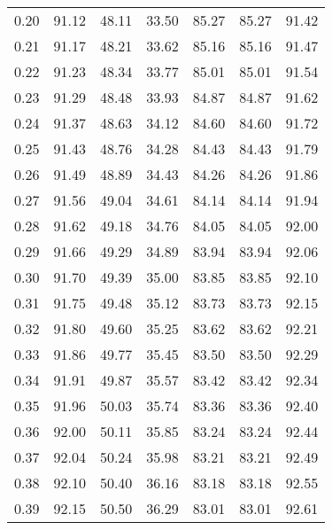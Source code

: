 \begin{tabular}{|c|c|c|c|c|c|c|}
      0.20 &     91.12 &     48.11 &      33.50 &   85.27 &      85.27 &         91.42 \\
      0.21 &     91.17 &     48.21 &      33.62 &   85.16 &      85.16 &         91.47 \\
      0.22 &     91.23 &     48.34 &      33.77 &   85.01 &      85.01 &         91.54 \\
      0.23 &     91.29 &     48.48 &      33.93 &   84.87 &      84.87 &         91.62 \\
      0.24 &     91.37 &     48.63 &      34.12 &   84.60 &      84.60 &         91.72 \\
      0.25 &     91.43 &     48.76 &      34.28 &   84.43 &      84.43 &         91.79 \\
      0.26 &     91.49 &     48.89 &      34.43 &   84.26 &      84.26 &         91.86 \\
      0.27 &     91.56 &     49.04 &      34.61 &   84.14 &      84.14 &         91.94 \\
      0.28 &     91.62 &     49.18 &      34.76 &   84.05 &      84.05 &         92.00 \\
      0.29 &     91.66 &     49.29 &      34.89 &   83.94 &      83.94 &         92.06 \\
      0.30 &     91.70 &     49.39 &      35.00 &   83.85 &      83.85 &         92.10 \\
      0.31 &     91.75 &     49.48 &      35.12 &   83.73 &      83.73 &         92.15 \\
      0.32 &     91.80 &     49.60 &      35.25 &   83.62 &      83.62 &         92.21 \\
      0.33 &     91.86 &     49.77 &      35.45 &   83.50 &      83.50 &         92.29 \\
      0.34 &     91.91 &     49.87 &      35.57 &   83.42 &      83.42 &         92.34 \\
      0.35 &     91.96 &     50.03 &      35.74 &   83.36 &      83.36 &         92.40 \\
      0.36 &     92.00 &     50.11 &      35.85 &   83.24 &      83.24 &         92.44 \\
      0.37 &     92.04 &     50.24 &      35.98 &   83.21 &      83.21 &         92.49 \\
      0.38 &     92.10 &     50.40 &      36.16 &   83.18 &      83.18 &         92.55 \\
      0.39 &     92.15 &     50.50 &      36.29 &   83.01 &      83.01 &         92.61 \\

\end{tabular}
